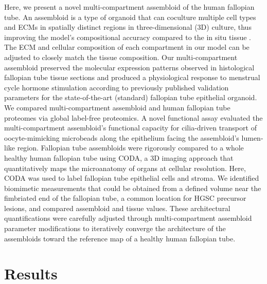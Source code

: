 \begin{refsection}
    Here, we present a novel multi-compartment assembloid of the human fallopian tube. An assembloid is a type of organoid that can coculture multiple cell types and ECMs in spatially distinct regions in three-dimensional (3D) culture, thus improving the model’s compositional accuracy compared to the in situ tissue \cite{kanton2022a,pa2022a}. The ECM and cellular composition of each compartment in our model can be adjusted to closely match the tissue composition. Our multi-compartment assembloid preserved the molecular expression patterns observed in histological fallopian tube tissue sections and produced a physiological response to menstrual cycle hormone stimulation according to previously published validation parameters for the state-of-the-art (standard) fallopian tube epithelial organoid\cite{kessler2015a,xie2018a,feng2022a}. We compared multi-compartment assembloid and human fallopian tube proteomes via global label-free proteomics. A novel functional assay evaluated the multi-compartment assembloid’s functional capacity for cilia-driven transport of oocyte-mimicking microbeads along the epithelium facing the assembloid’s lumen-like region. Fallopian tube assembloids were rigorously compared to a whole healthy human fallopian tube using CODA\cite{kiemen2022a,sneider2022a,yang2022a,xue2022a,groot2021a,kiemen2023a}, a 3D imaging approach that quantitatively maps the microanatomy of organs at cellular resolution. Here, CODA was used to label fallopian tube epithelial cells and stroma. We identified biomimetic measurements that could be obtained from a defined volume near the fimbriated end of the fallopian tube, a common location for HGSC precursor lesions\cite{labidi-galy2017a,shih2021a}, and compared assembloid and tissue values. These architectural quantifications were carefully adjusted through multi-compartment assembloid parameter modifications to iteratively converge the architecture of the assembloids toward the reference map of a healthy human fallopian tube. 
    
    \section{Results}
    

\end{refsection}
